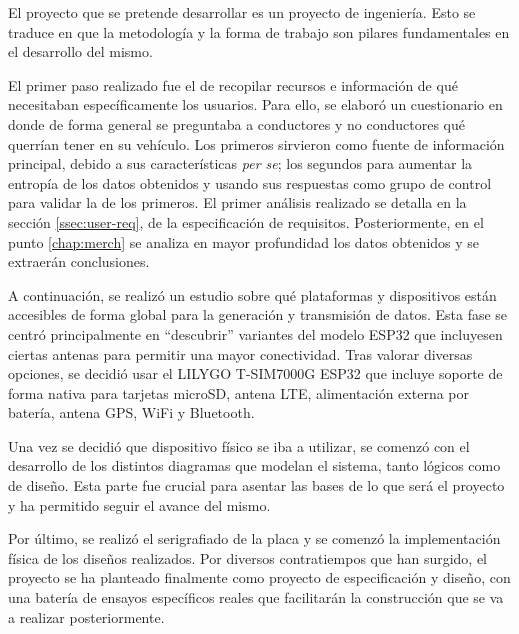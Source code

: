 El proyecto que se pretende desarrollar es un proyecto de ingeniería. Esto se
traduce en que la metodología y la forma de trabajo son pilares fundamentales
en el desarrollo del mismo.

El primer paso realizado fue el de recopilar recursos e información de qué
necesitaban específicamente los usuarios. Para ello, se elaboró un cuestionario
en donde de forma general se preguntaba a conductores y no conductores qué querrían
tener en su vehículo. Los primeros sirvieron como fuente de información principal,
debido a sus características \textit{per se}; los segundos para aumentar la entropía
de los datos obtenidos y usando sus respuestas como grupo de control para validar la
de los primeros. El primer análisis realizado se detalla
en la sección \ref{ssec:user-req}, de la especificación de requisitos. Posteriormente,
en el punto \ref{chap:merch} se analiza en mayor profundidad los datos obtenidos
y se extraerán conclusiones.

A continuación, se realizó un estudio sobre qué plataformas y dispositivos están
accesibles de forma global para la generación y transmisión de datos. Esta fase
se centró principalmente en ``descubrir'' variantes del modelo ESP32 que incluyesen
ciertas antenas para permitir una mayor conectividad. Tras valorar diversas opciones,
se decidió usar el LILYGO T-SIM7000G ESP32 que incluye soporte de forma nativa para
tarjetas microSD, antena \ac{LTE}, alimentación externa por batería, antena \ac{GPS}, WiFi y
Bluetooth.

Una vez se decidió que dispositivo físico se iba a utilizar, se comenzó con el desarrollo
de los distintos diagramas que modelan el sistema, tanto lógicos como de diseño. Esta
parte fue crucial para asentar las bases de lo que será el proyecto y ha permitido seguir
el avance del mismo.

Por último, se realizó el serigrafiado de la placa y se comenzó la implementación
física de los diseños realizados. Por diversos contratiempos que han surgido, el proyecto
se ha planteado finalmente como proyecto de especificación y diseño, con una batería
de ensayos específicos reales que facilitarán la construcción que se va a realizar
posteriormente.
